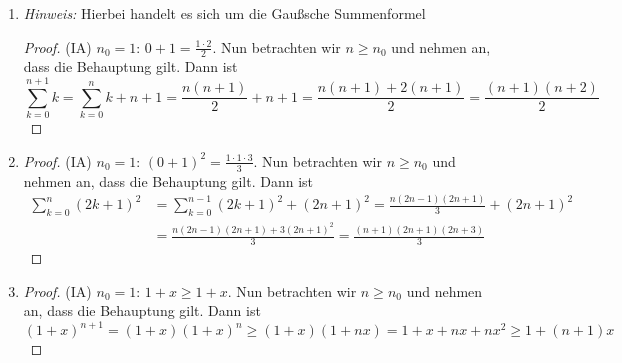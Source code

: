 \documentclass[12pt]{exam}
\begin{document}
\begin{questions}
\begin{solution}
\begin{enumerate}
\begin{proof}
			\[\sum\limits_{k=0}^{n} 3^k = \sum\limits_{k=0}^{n-1}3^k+3^n= \frac{3^n-1}{2}+3^n=\frac{2\cdot 3^n+3^n-1}{2}=\frac{3^{n+1}-1}{2}
			\]
		\end{proof}
		\item {\it Hinweis:} Hierbei handelt es sich um die Gaußsche Summenformel
		\begin{proof}
			(IA) $n_0=1$: $0+1=\frac{1\cdot2}{2}$\checkmark. Nun betrachten wir $n\geq n_0$ und nehmen an, dass die Behauptung gilt. Dann ist
			\[\sum\limits_{k=0}^{n+1} k=\sum\limits_{k=0}^{n}k+n+1=\frac{n(n+1)}{2}+n+1=\frac{n(n+1)+2(n+1)}{2}=\frac{(n+1)(n+2)}{2}
			\]
		\end{proof}
		\item \begin{proof}
			(IA) $n_0=1$: $(0+1)^2=\frac{1\cdot1\cdot3}{3}$\checkmark. Nun betrachten wir $n\geq n_0$ und nehmen an, dass die Behauptung gilt. Dann ist
			\begin{align*}
				\sum\limits_{k=0}^{n} (2k+1)^2&=\sum\limits_{k=0}^{n-1} (2k+1)^2+(2n+1)^2=\frac{n(2n-1)(2n+1)}{3}+(2n+1)^2\\
				&=\frac{n(2n-1)(2n+1)+3(2n+1)^2}{3}=\frac{(n+1)(2n+1)(2n+3)}{3}
			\end{align*}
		\end{proof}
		\item \begin{proof}
			(IA) $n_0=1$: $1+x\geq 1+x$\checkmark. Nun betrachten wir $n\geq n_0$ und nehmen an, dass die Behauptung gilt. Dann ist
			\[(1+x)^{n+1}=(1+x)(1+x)^n\ge (1+x)(1+nx)=1+x+nx+nx^2\geq 1+(n+1)x
			\]
		\end{proof}
	\end{enumerate}
\end{solution}




\end{questions}
\end{document}
